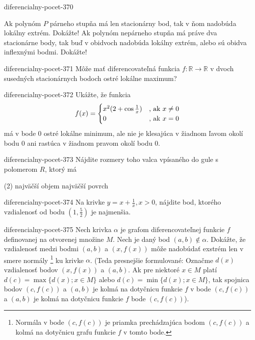 \begin{defproblem}{diferencialny-pocet-370}
\begin{tasks}
\task
  Ak polynóm $P$ párneho stupňa má len stacionárny bod, tak v ňom nadobúda
  lokálny extrém. Dokážte!
\task
  Ak polynóm nepárneho stupňa má práve dva stacionárne body, tak buď v obidvoch
  nadobúda lokálny extrém, alebo sú obidva inflexnými bodmi. Dokážte!
\end{tasks}
\end{defproblem}

\begin{defproblem}{diferencialny-pocet-371}
Môže mať diferencovateľná funkcia $f:\mathbb{R} \rightarrow \mathbb{R}$ v dvoch
susedných stacionárnych bodoch ostré lokálne maximum?
\end{defproblem}

\begin{defproblem}{diferencialny-pocet-372}
Ukážte, že funkcia
\[
  f(x)=
    \begin{cases}
      x^2(2+\cos \frac{1}{x}) & $, ak $ x \neq 0 \\
      0 &  $, ak $ x=0
    \end{cases}
\]
má v bode $0$ ostré lokálne minimum, ale nie je klesajúca v žiadnom ľavom okolí
bodu $0$ ani rastúca v žiadnom pravom okolí bodu $0$.
\end{defproblem}

\begin{defproblem}{diferencialny-pocet-373}
Nájdite rozmery toho valca vpísaného do gule s polomerom $R$, ktorý má
\begin{tasks}(2)
\task najväčší objem
\task najväčší povrch
\end{tasks}
\end{defproblem}

\begin{defproblem}{diferencialny-pocet-374}
Na krivke $y=x+\frac{1}{x},x>0$, nájdite bod, ktorého vzdialenosť od bodu
$(1,\frac{5}{2})$ je najmenšia.
\end{defproblem}

\begin{defproblem}{diferencialny-pocet-375}
Nech krivka $\alpha$ je grafom diferencovateľnej funkcie $f$ definovanej na
otvorenej množine $M$. Nech je daný bod $(a,b)\notin \alpha$. Dokážte, že
vzdialenosť medzi bodmi $(a,b)$ a $(x,f(x))$ môže nadobúdať exstrém len v smere
normály \footnote{Normála v bode $(c,f(c))$ je priamka prechádzajúca bodom
$(c,f(c))$ a kolmá na dotyčnicu grafu funkcie $f$ v tomto bode.} ku krivke
$\alpha$. (Teda presnejšie formulované: Označme $d(x)$ vzdialenosť bodov
$(x,f(x))$ a $(a,b)$. Ak pre niektoré $x\in M$ platí $d(c)=\max \{d(x);x\in M\}$
alebo $d(c)=\min \{d(x);x\in M\}$, tak spojnica bodov $(c,f(c))$ a $(a,b)$ je
kolmá na dotyčnicu funkcie $f$ v bode $(c,f(c))$ a $(a,b)$ je kolmá na dotyčnicu
funkcie $f$  bode $(c,f(c))$).
\end{defproblem}

